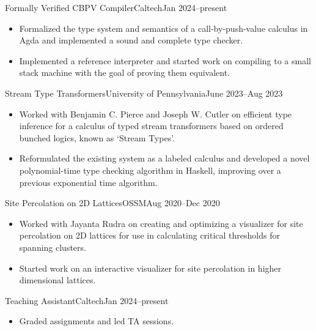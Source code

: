 \documentclass[a4paper]{article}
\begin{document}
    \begin{activity*}{Formally Verified CBPV Compiler}{Caltech}{Jan 2024--present}
      \begin{itemize}[topsep=5pt, partopsep=0pt, itemsep=-1pt]
        \item Formalized the type system and semantics of a call-by-push-value calculus in Agda and implemented a sound and complete type checker.
        \item Implemented a reference interpreter and started work on compiling to a small stack machine with the goal of proving them equivalent.
      \end{itemize}
    \end{activity*}

    \begin{activity*}{Stream Type Transformers}{University of Pennsylvania}{June 2023--Aug 2023}
      \begin{itemize}[topsep=5pt, partopsep=0pt, itemsep=-1pt]
        \item Worked with Benjamin C. Pierce and Joseph W. Cutler on efficient type inference for a calculus of typed stream transformers based on ordered bunched logics, known as `Stream Types'.
        \item Reformulated the existing system as a labeled calculus and developed a novel polynomial-time type checking algorithm in Haskell, improving over a previous exponential time algorithm.
      \end{itemize}
    \end{activity*}

    \begin{activity*}{Site Percolation on 2D Lattices}{OSSM}{Aug 2020--Dec 2020}
      \begin{itemize}[topsep=5pt, partopsep=0pt, itemsep=-1pt]
        \item Worked with Jayanta Rudra on creating and optimizing a visualizer for site percolation on 2D lattices for use in calculating critical thresholds for spanning clusters.
        \item Started work on an interactive visualizer for site percolation in higher dimensional lattices.
      \end{itemize}
    \end{activity*}

    \begin{activity*}{Teaching Assistant}{Caltech}{Jan 2024--present}
      \begin{itemize}[topsep=5pt, partopsep=0pt, itemsep=-1pt]
        \item Graded assignments and led TA sessions.
      \end{itemize}
    \end{activity*}
\end{document}
